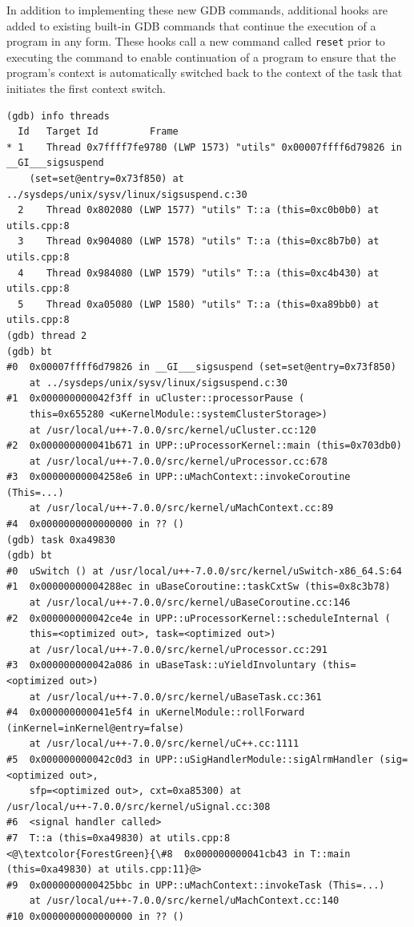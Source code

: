 In addition to implementing these new GDB commands, additional hooks are added
to existing built-in GDB commands that continue the execution of a program in any form. These hooks
call a new command called \verb|reset| prior to executing the command to enable
continuation of a program to ensure that
the program's context is automatically switched back to the context of the task
that initiates the first
context switch.
\begin{lstlisting}[caption={task <task\_address> command}, label={pushtask}]
(gdb) info threads
  Id   Target Id         Frame
* 1    Thread 0x7ffff7fe9780 (LWP 1573) "utils" 0x00007ffff6d79826 in __GI___sigsuspend
    (set=set@entry=0x73f850) at ../sysdeps/unix/sysv/linux/sigsuspend.c:30
  2    Thread 0x802080 (LWP 1577) "utils" T::a (this=0xc0b0b0) at utils.cpp:8
  3    Thread 0x904080 (LWP 1578) "utils" T::a (this=0xc8b7b0) at utils.cpp:8
  4    Thread 0x984080 (LWP 1579) "utils" T::a (this=0xc4b430) at utils.cpp:8
  5    Thread 0xa05080 (LWP 1580) "utils" T::a (this=0xa89bb0) at utils.cpp:8
(gdb) thread 2
(gdb) bt
#0  0x00007ffff6d79826 in __GI___sigsuspend (set=set@entry=0x73f850)
    at ../sysdeps/unix/sysv/linux/sigsuspend.c:30
#1  0x000000000042f3ff in uCluster::processorPause (
    this=0x655280 <uKernelModule::systemClusterStorage>)
    at /usr/local/u++-7.0.0/src/kernel/uCluster.cc:120
#2  0x000000000041b671 in UPP::uProcessorKernel::main (this=0x703db0)
    at /usr/local/u++-7.0.0/src/kernel/uProcessor.cc:678
#3  0x00000000004258e6 in UPP::uMachContext::invokeCoroutine (This=...)
    at /usr/local/u++-7.0.0/src/kernel/uMachContext.cc:89
#4  0x0000000000000000 in ?? ()
(gdb) task 0xa49830
(gdb) bt
#0  uSwitch () at /usr/local/u++-7.0.0/src/kernel/uSwitch-x86_64.S:64
#1  0x00000000004288ec in uBaseCoroutine::taskCxtSw (this=0x8c3b78)
    at /usr/local/u++-7.0.0/src/kernel/uBaseCoroutine.cc:146
#2  0x000000000042ce4e in UPP::uProcessorKernel::scheduleInternal (
    this=<optimized out>, task=<optimized out>)
    at /usr/local/u++-7.0.0/src/kernel/uProcessor.cc:291
#3  0x000000000042a086 in uBaseTask::uYieldInvoluntary (this=<optimized out>)
    at /usr/local/u++-7.0.0/src/kernel/uBaseTask.cc:361
#4  0x000000000041e5f4 in uKernelModule::rollForward (inKernel=inKernel@entry=false)
    at /usr/local/u++-7.0.0/src/kernel/uC++.cc:1111
#5  0x000000000042c0d3 in UPP::uSigHandlerModule::sigAlrmHandler (sig=<optimized out>,
    sfp=<optimized out>, cxt=0xa85300) at /usr/local/u++-7.0.0/src/kernel/uSignal.cc:308
#6  <signal handler called>
#7  T::a (this=0xa49830) at utils.cpp:8
<@\textcolor{ForestGreen}{\#8  0x000000000041cb43 in T::main (this=0xa49830) at utils.cpp:11}@>
#9  0x0000000000425bbc in UPP::uMachContext::invokeTask (This=...)
    at /usr/local/u++-7.0.0/src/kernel/uMachContext.cc:140
#10 0x0000000000000000 in ?? ()
\end{lstlisting}

